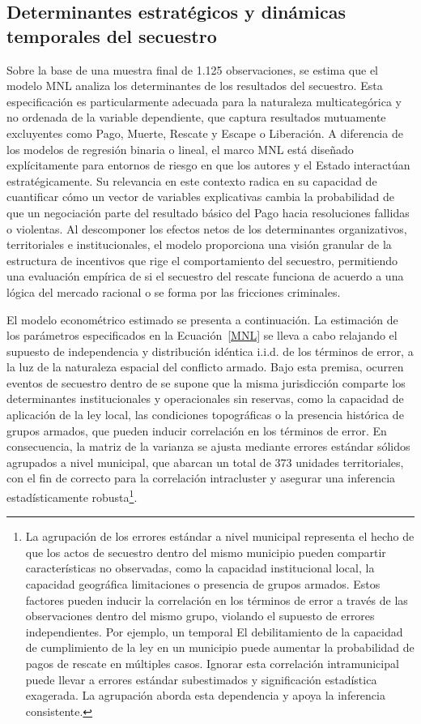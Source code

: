 \documentclass[12pt]{article}
\theoremstyle{definition}
\theoremstyle{remark}
\newcommand{\1}{\mathbf{1}}
\begin{document}
\subsection{Determinantes estratégicos y dinámicas temporales del secuestro}

Sobre la base de una muestra final de 1.125 observaciones, se estima que el modelo MNL analiza los determinantes de los resultados del secuestro. Esta especificación es particularmente adecuada para la naturaleza multicategórica y no ordenada de la variable dependiente, que captura resultados mutuamente excluyentes como Pago, Muerte, Rescate y Escape o Liberación. A diferencia de los modelos de regresión binaria o lineal, el marco MNL está diseñado explícitamente para entornos de riesgo en que los autores y el Estado interactúan estratégicamente. Su relevancia en este contexto radica en su capacidad de cuantificar cómo un vector de variables explicativas cambia la probabilidad de que un negociación parte del resultado básico del Pago hacia resoluciones fallidas o violentas. Al descomponer los efectos netos de los determinantes organizativos, territoriales e institucionales, el modelo proporciona una visión granular de la estructura de incentivos que rige el comportamiento del secuestro, permitiendo una evaluación empírica de si el secuestro del rescate funciona de acuerdo a una lógica del mercado racional o se forma por las fricciones criminales.

El modelo econométrico estimado se presenta a continuación. La estimación de los parámetros especificados en la Ecuación~\ref{MNL} se lleva a cabo relajando el supuesto de independencia y distribución idéntica i.i.d. de los términos de error, a la luz de la naturaleza espacial del conflicto armado. Bajo esta premisa, ocurren eventos de secuestro dentro de se supone que la misma jurisdicción comparte los determinantes institucionales y operacionales sin reservas, como la capacidad de aplicación de la ley local, las condiciones topográficas o la presencia histórica de grupos armados, que pueden inducir correlación en los términos de error. En consecuencia, la matriz de la varianza se ajusta mediante errores estándar sólidos agrupados a nivel municipal, que abarcan un total de 373 unidades territoriales, con el fin de correcto para la correlación intracluster y asegurar una inferencia estadísticamente robusta\footnote{La agrupación de los errores estándar a nivel municipal representa el hecho de que los actos de secuestro dentro del mismo municipio pueden compartir características no observadas, como la capacidad institucional local, la capacidad geográfica limitaciones o presencia de grupos armados. Estos factores pueden inducir la correlación en los términos de error a través de las observaciones dentro del mismo grupo, violando el supuesto de errores independientes. Por ejemplo, un temporal El debilitamiento de la capacidad de cumplimiento de la ley en un municipio puede aumentar la probabilidad de pagos de rescate en múltiples casos. Ignorar esta correlación intramunicipal puede llevar a errores estándar subestimados y significación estadística exagerada. La agrupación aborda esta dependencia y apoya la inferencia consistente.}. 
\end{document}
